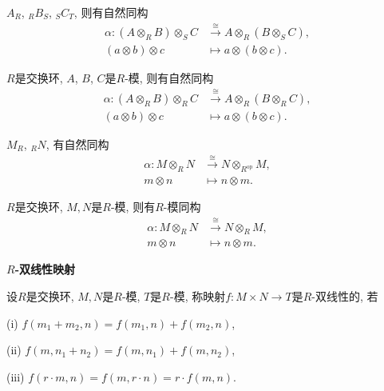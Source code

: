 \begin{proposition}
    $A_R$, $_RB_S$, $_S C_T$, 则有自然同构
        \begin{align*}
            \alpha: (A \otimes_R B) \otimes_S C &\xrightarrow{\cong} 
            A \otimes_R (B \otimes_S C),\\
            (a\otimes b)\otimes c &\mapsto a\otimes (b\otimes c).
        \end{align*}
\end{proposition}

\begin{corollary}
    $R$是交换环, $A$, $B$, $C$是$R$-模, 则有自然同构
        \begin{align*}
            \alpha: (A \otimes_R B) \otimes_R C &\xrightarrow{\cong} A \otimes_R (B \otimes_R C),\\
            (a\otimes b)\otimes c &\mapsto a\otimes (b\otimes c).
        \end{align*}
\end{corollary}

\begin{proposition}
    $M_R$, $_RN$, 有自然同构
        \begin{align*}
            \alpha: M\otimes_R N &\xrightarrow{\cong} N\otimes_{R^{\operatorname{op}}} M,\\
            m\otimes n &\mapsto n\otimes m.
        \end{align*}
\end{proposition}

\begin{corollary}
    $R$是交换环, $M,N$是$R$-模, 则有$R$-模同构
        \begin{align*}
            \alpha: M\otimes_R N &\xrightarrow{\cong} N\otimes_{R} M,\\
            m\otimes n &\mapsto n\otimes m.
        \end{align*}
\end{corollary}

\begin{definition} \textbf{$R$-双线性映射}\par
    \qquad 设$R$是交换环, $M,N$是$R$-模, $T$是$R$-模, 
    称映射$f: M\times N\rightarrow T$是$R$-双线性的, 若\par
    \qquad \qquad (i) $f(m_1+m_2,n)=f(m_1,n)+f(m_2,n)$,\par
    \qquad \qquad (ii) $f(m,n_1+n_2)=f(m,n_1)+f(m,n_2)$,\par
    \qquad \qquad (iii) $f(r\cdot m, n)=f(m, r\cdot n)=r\cdot f(m,n)$.
\end{definition}

